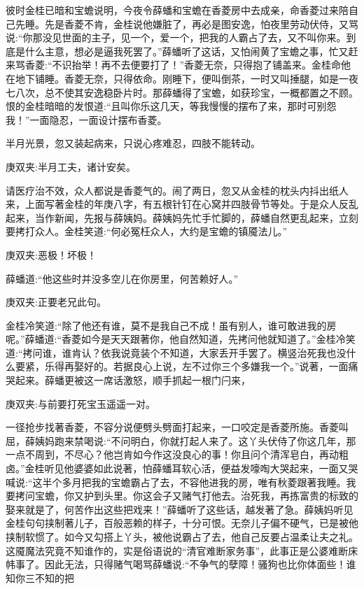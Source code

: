 \begin{parag}
    彼时金桂已暗和宝蟾说明，今夜令薛蟠和宝蟾在香菱房中去成亲，命香菱过来陪自己先睡。先是香菱不肯，金桂说他嫌脏了，再必是图安逸，怕夜里劳动伏侍，又骂说:“你那没见世面的主子，见一个，爱一个，把我的人霸占了去，又不叫你来。到底是什么主意，想必是逼我死罢了。”薛蟠听了这话，又怕闹黄了宝蟾之事，忙又赶来骂香菱:“不识抬举！再不去便要打了！”香菱无奈，只得抱了铺盖来。金桂命他在地下铺睡。香菱无奈，只得依命。刚睡下，便叫倒茶，一时又叫捶腿，如是一夜七八次，总不使其安逸稳卧片时。那薛蟠得了宝蟾，如获珍宝，一概都置之不顾。恨的金桂暗暗的发恨道:“且叫你乐这几天，等我慢慢的摆布了来，那时可别怨我！”一面隐忍，一面设计摆布香菱。
\end{parag}


\begin{parag}
    半月光景，忽又装起病来，只说心疼难忍，四肢不能转动。\begin{note}庚双夹:半月工夫，诸计安矣。\end{note}请医疗治不效，众人都说是香菱气的。闹了两日，忽又从金桂的枕头内抖出纸人来，上面写著金桂的年庚八字，有五根针钉在心窝并四肢骨节等处。于是众人反乱起来，当作新闻，先报与薛姨妈。薛姨妈先忙手忙脚的，薛蟠自然更乱起来，立刻要拷打众人。金桂笑道:“何必冤枉众人，大约是宝蟾的镇魇法儿。”\begin{note}庚双夹:恶极！坏极！\end{note}薛蟠道:“他这些时并没多空儿在你房里，何苦赖好人。”\begin{note}庚双夹:正要老兄此句。\end{note}金桂冷笑道:“除了他还有谁，莫不是我自己不成！虽有别人，谁可敢进我的房呢。”薛蟠道:“香菱如今是天天跟著你，他自然知道，先拷问他就知道了。”金桂冷笑道:“拷问谁，谁肯认？依我说竟装个不知道，大家丢开手罢了。横竖治死我也没什么要紧，乐得再娶好的。若据良心上说，左不过你三个多嫌我一个。”说著，一面痛哭起来。薛蟠更被这一席话激怒，顺手抓起一根门闩来，\begin{note}庚双夹:与前要打死宝玉遥遥一对。\end{note}一径抢步找著香菱，不容分说便劈头劈面打起来，一口咬定是香菱所施。香菱叫屈，薛姨妈跑来禁喝说:“不问明白，你就打起人来了。这丫头伏侍了你这几年，那一点不周到，不尽心？他岂肯如今作这没良心的事！你且问个清浑皂白，再动粗卤。”金桂听见他婆婆如此说著，怕薛蟠耳软心活，便益发嚎啕大哭起来，一面又哭喊说:“这半个多月把我的宝蟾霸占了去，不容他进我的房，唯有秋菱跟著我睡。我要拷问宝蟾，你又护到头里。你这会子又赌气打他去。治死我，再拣富贵的标致的娶来就是了，何苦作出这些把戏来！”薛蟠听了这些话，越发著了急。薛姨妈听见金桂句句挟制著儿子，百般恶赖的样子，十分可恨。无奈儿子偏不硬气，已是被他挟制软惯了。如今又勾搭上丫头，被他说霸占了去，他自己反要占温柔让夫之礼。这魇魔法究竟不知谁作的，实是俗语说的“清官难断家务事”，此事正是公婆难断床帏事了。因此无法，只得赌气喝骂薛蟠说:“不争气的孽障！骚狗也比你体面些！谁知你三不知的把
\end{parag}
